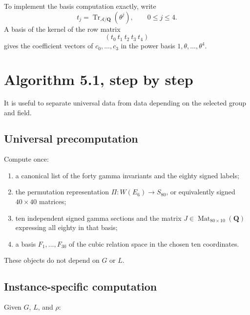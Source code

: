\documentclass[11pt]{article}
\newcommand{\QQ}{\mathbf{Q}}
\newcommand{\Tr}{\operatorname{Tr}}
\newcommand{\Mat}{\operatorname{Mat}}
\newcommand{\cA}{\mathscr{A}}
\begin{document}
To implement the basis computation exactly, write
\[
  t_j=\Tr_{\cA/\QQ}(\theta^j),\qquad 0\leq j\leq4.
\]
A basis of the kernel of the row matrix
\[
  (t_0\ t_1\ t_2\ t_3\ t_4)
\]
gives the coefficient vectors of $c_0,\ldots,c_3$ in the power basis
$1,\theta,\ldots,\theta^4$.

\section{Algorithm 5.1, step by step}

It is useful to separate universal data from data depending on the selected
group and field.

\subsection{Universal precomputation}

Compute once:

\begin{enumerate}
\item a canonical list of the forty gamma invariants and the eighty signed
labels;
\item the permutation representation
$\Pi:W(E_6)\to S_{80}$, or equivalently signed $40\times40$ matrices;
\item ten independent signed gamma sections and the matrix
$J\in\Mat_{80\times10}(\QQ)$ expressing all eighty in that basis;
\item a basis $F_1,\ldots,F_{30}$ of the cubic relation space in the chosen
ten coordinates.
\end{enumerate}

These objects do not depend on $G$ or $L$.

\subsection{Instance-specific computation}

Given $G$, $L$, and $\rho$:
\end{document}
